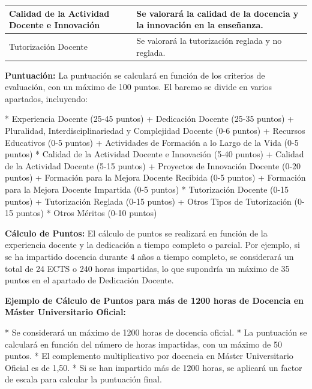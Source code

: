 \documentclass{article}
\begin{document}
\begin{itemize}
\begin{itemize}
\begin{table}[h!]
\begin{tabular}{|p{}|p{}|}
                    Calidad de la Actividad Docente e Innovación            & Se valorará la calidad de la docencia y la innovación en la enseñanza.                                                                                               \\\hline
                    Tutorización Docente                                    & Se valorará la tutorización reglada y no reglada.                                                                                                                    \\\hline
                  \end{tabular}\end{table}
                \vspace{0.4cm}

                \textbf{Puntuación:}
                La puntuación se calculará en función de los criterios de evaluación, con un máximo de 100 puntos. El baremo se divide en varios apartados, incluyendo:

                * Experiencia Docente (25-45 puntos)
                + Dedicación Docente (25-35 puntos)
                + Pluralidad, Interdisciplinariedad y Complejidad Docente (0-6 puntos)
                + Recursos Educativos (0-5 puntos)
                + Actividades de Formación a lo Largo de la Vida (0-5 puntos)
                * Calidad de la Actividad Docente e Innovación (5-40 puntos)
                + Calidad de la Actividad Docente (5-15 puntos)
                + Proyectos de Innovación Docente (0-20 puntos)
                + Formación para la Mejora Docente Recibida (0-5 puntos)
                + Formación para la Mejora Docente Impartida (0-5 puntos)
                * Tutorización Docente (0-15 puntos)
                + Tutorización Reglada (0-15 puntos)
                + Otros Tipos de Tutorización (0-15 puntos)
                * Otros Méritos (0-10 puntos)

                \textbf{Cálculo de Puntos:}
                El cálculo de puntos se realizará en función de la experiencia docente y la dedicación a tiempo completo o parcial. Por ejemplo, si se ha impartido docencia durante 4 años a tiempo completo, se considerará un total de 24 ECTS o 240 horas impartidas, lo que supondría un máximo de 35 puntos en el apartado de Dedicación Docente.

                \textbf{Ejemplo de Cálculo de Puntos para más de 1200 horas de Docencia en Máster Universitario Oficial:}

                * Se considerará un máximo de 1200 horas de docencia oficial.
                * La puntuación se calculará en función del número de horas impartidas, con un máximo de 50 puntos.
                * El complemento multiplicativo por docencia en Máster Universitario Oficial es de 1,50.
                * Si se han impartido más de 1200 horas, se aplicará un factor de escala para calcular la puntuación final.


\end{itemize}
\end{itemize}
\end{document}
